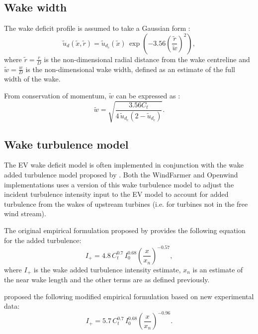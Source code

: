 \documentclass[11pt,a4paper]{article}
\begin{document}
\subsection{Wake width}\label{wake_width}

The wake deficit profile is assumed to take a Gaussian form \parencite{Ainslie_1988, Anderson_2011}:
\begin{equation}\label{eq:wake_deficit_profile}
\tilde{u}_{d} (\tilde{x}, \tilde{r}) = \tilde{u}_{d_{c}} (\tilde{x}) \, \exp \left( -3.56 \left( \frac{\tilde{r}}{\tilde{w}} \right)^{2} \right),
\end{equation}
where $\tilde{r} = \frac{r}{D}$ is the non-dimensional radial distance from the wake centreline and $\tilde{w} = \frac{w}{D}$ is the non-dimensional wake width, defined as an estimate of the full width of the wake.

From conservation of momentum, $\tilde{w}$ can be expressed as \parencite{Ainslie_1988, Anderson_2011}:
\begin{equation}\label{eq:wake_width}
\tilde{w} = \sqrt{\frac{3.56 C_{t}}{4 \, \tilde{u}_{d_{c}} \left( 2 - \tilde{u}_{d_{c}} \right)}}.
\end{equation}

\subsection{Wake turbulence model}\label{wake_turbulence_model}

The EV wake deficit model is often implemented in conjunction with the wake added turbulence model proposed by \textcite{QuartonAndAinslie1990}. Both the WindFarmer and Openwind implementations uses a version of this wake turbulence model to adjust the incident turbulence intensity input to the EV model to account for added turbulence from the wakes of upstream turbines (i.e. for turbines not in the free wind stream).

The original empirical formulation proposed by \textcite{QuartonAndAinslie1990} provides the following equation for the added turbulence:
\begin{equation}\label{eq:added_turbulence_original}
I_{+} = 4.8 \, C_{t}^{0.7} \, I_{0}^{0.68} \left( \frac{x}{x_{n}} \right)^{-0.57},
\end{equation}
where $I_{+}$ is the wake added turbulence intensity estimate, $x_{n}$ is an estimate of the near wake length and the other terms are as defined previously.

\textcite{Hassan1992} proposed the following modified empirical formulation based on new experimental data:
\begin{equation}\label{eq:added_turbulence_modified}
I_{+} = 5.7 \, C_{t}^{0.7} \, I_{0}^{0.68} \left( \frac{x}{x_{n}} \right)^{-0.96}.
\end{equation}
\end{document}
